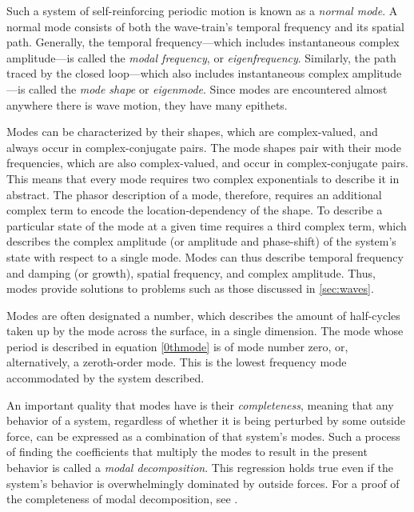 \documentclass[a4paper,10pt]{report}
\numberwithin{equation}{section}
\begin{document}
Such a system of self-reinforcing periodic motion is known as a \emph{normal mode}. A normal mode consists of both the wave-train's temporal frequency and its spatial path. Generally, the temporal frequency---which includes instantaneous complex amplitude---is called the \emph{modal frequency}, or \emph{eigenfrequency}. Similarly, the path traced by the closed loop---which also includes instantaneous complex amplitude---is called the \emph{mode shape} or \emph{eigenmode}. Since modes are encountered almost anywhere there is wave motion, they have many epithets. \cite[p.~319]{Cremer1973}

Modes can be characterized by their shapes, which are complex-valued, and always occur in complex-conjugate pairs. The mode shapes pair with their mode frequencies, which are also complex-valued, and occur in complex-conjugate pairs. This means that every mode requires two complex exponentials to describe it in abstract. The phasor description of a mode, therefore, requires an additional complex term to encode the location-dependency of the shape. To describe a particular state of the mode at a given time requires a third complex term, which describes the complex amplitude (or amplitude and phase-shift) of the system's state with respect to a single mode. Modes can thus describe temporal frequency and damping (or growth), spatial frequency, and complex amplitude. Thus, modes provide solutions to problems such as those discussed in \ref{sec:waves}. 

Modes are often designated a number, which describes the amount of half-cycles taken up by the mode across the surface, in a single dimension. The mode whose period is described in equation \eqref{0thmode} is of mode number zero, or, alternatively, a zeroth-order mode. This is the lowest frequency mode accommodated by the system described.

An important quality that modes have is their \emph{completeness}, meaning that any behavior of a system, regardless of whether it is being perturbed by some outside force, can be expressed as a combination of that system's modes. Such a process of finding the coefficients that multiply the modes to result in the present behavior is called a \emph{modal decomposition}. This regression holds true even if the system's behavior is overwhelmingly dominated by outside forces. For a proof of the completeness of modal decomposition, see \cite[p.~281]{Courant1937}.
\end{document}
